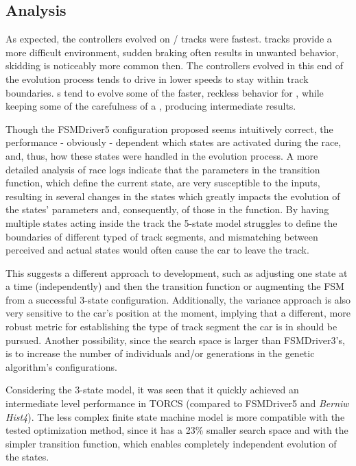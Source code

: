 \subsection{Analysis}
As expected, the controllers evolved on / tracks were fastest.  tracks provide a more difficult environment, sudden braking often results in unwanted behavior, skidding is noticeably more common then. The controllers evolved in this end of the evolution process tends to drive in lower speeds to stay within track boundaries. s tend to evolve some of the faster, reckless behavior for , while keeping some of the carefulness of a , producing intermediate results.

Though the FSMDriver5 configuration proposed seems intuitively correct, the performance - obviously - dependent which states are activated during the race, and, thus, how these states were handled in the evolution process. A more detailed analysis of race logs indicate that the parameters in the transition function, which define the current state, are very susceptible to the inputs, resulting in several changes in the states which greatly impacts the evolution of the states' parameters and, consequently, of those in the function. By having multiple states acting inside the track the 5-state model struggles to define the boundaries of different typed of track segments, and mismatching between perceived and actual states would often cause the car to leave the track.

This suggests a different approach to development, such as adjusting one state at a time (independently) and then the transition function or augmenting the FSM from a successful 3-state configuration. Additionally, the variance approach is also very sensitive to the car's position at the moment, implying that a different, more robust metric for establishing the type of track segment the car is in should be pursued. Another possibility, since the search space is larger than FSMDriver3's, is to increase the number of individuals and/or generations in the genetic algorithm's configurations.

Considering the 3-state model, it was seen that it quickly achieved an intermediate level performance in TORCS (compared to FSMDriver5 and \emph{Berniw Hist4}). The less complex finite state machine model is more compatible with the tested optimization method, since it has a 23\% smaller search space and with the simpler transition function, which enables completely independent evolution of the states.

